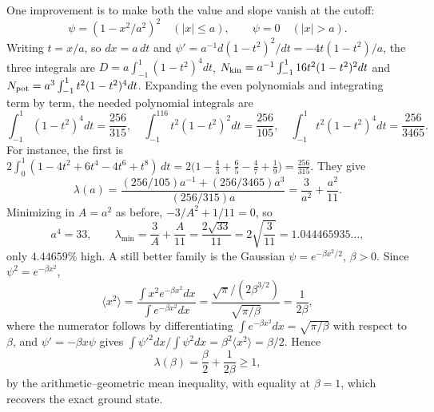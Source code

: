 One improvement is to make both the value and slope vanish at the
cutoff:
\[
 \psi=(1-x^2/a^2)^2\quad (|x|\le a),\qquad \psi=0\quad(|x|>a).
\]
Writing $t=x/a$, so $dx=a\,dt$ and
$\psi'=a^{-1}d(1-t^2)^2/dt=-4t(1-t^2)/a$, the three integrals are
$D=a\int_{-1}^1(1-t^2)^4dt$,
$N_{\rm kin}=a^{-1}\int_{-1}^116t^2(1-t^2)^2dt$ and
$N_{\rm pot}=a^3\int_{-1}^1t^2(1-t^2)^4dt$. Expanding the even
polynomials and integrating term by term, the needed polynomial
integrals are
\[
 \int_{-1}^1(1-t^2)^4dt=\frac{256}{315},\quad
 \int_{-1}^116t^2(1-t^2)^2dt=\frac{256}{105},\quad
 \int_{-1}^1t^2(1-t^2)^4dt=\frac{256}{3465}.
\]
For instance, the first is
$2\int_0^1(1-4t^2+6t^4-4t^6+t^8)\,dt
=2\bigl(1-\frac43+\frac65-\frac47+\frac19\bigr)=\frac{256}{315}$.
They give
\[
 \lambda(a)=\frac{(256/105)a^{-1}+(256/3465)a^3}{(256/315)a}
 =\frac3{a^2}+\frac{a^2}{11}.
\]
Minimizing in $A=a^2$ as before, $-3/A^2+1/11=0$, so
\[
 a^4=33,\qquad
 \lambda_{\min}=\frac3A+\frac A{11}=\frac{2\sqrt{33}}{11}
 =2\sqrt{\frac3{11}}=1.044465935\ldots,
\]
only $4.44659\%$ high.  A still better family is the Gaussian
$\psi=e^{-\beta x^2/2}$, $\beta>0$.  Since $\psi^2=e^{-\beta x^2}$,
\[
 \langle x^2\rangle=\frac{\int x^2e^{-\beta x^2}dx}{\int e^{-\beta x^2}dx}
 =\frac{\sqrt\pi/(2\beta^{3/2})}{\sqrt{\pi/\beta}}=\frac1{2\beta},
\]
where the numerator follows by differentiating
$\int e^{-\beta x^2}dx=\sqrt{\pi/\beta}$ with respect to $\beta$,
and $\psi'=-\beta x\psi$ gives
$\int\psi'^2dx/\int\psi^2dx=\beta^2\langle x^2\rangle=\beta/2$. Hence
\[
 \lambda(\beta)=\frac{\beta}{2}+\frac1{2\beta}\ge1,
\]
by the arithmetic--geometric mean inequality, with equality at
$\beta=1$, which recovers the exact ground state.


